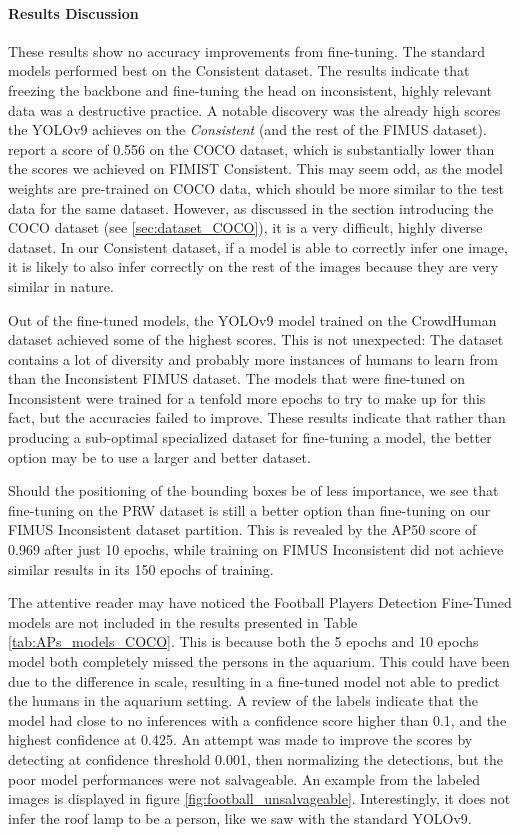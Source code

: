 \paragraph{Results Discussion}
\label{sec:table_discussion}
These results show no accuracy improvements from fine-tuning. The standard models performed best on the Consistent dataset. The results indicate that freezing the backbone and fine-tuning the head on inconsistent, highly relevant data was a destructive practice. A notable discovery was the already high scores the YOLOv9 achieves on the \textit{Consistent} (and the rest of the FIMUS dataset). \citeauthor{wang2024yolov9} report a score of 0.556 on the COCO dataset, which is substantially lower than the scores we achieved on FIMIST Consistent. This may seem odd, as the model weights are pre-trained on COCO data, which should be more similar to the test data for the same dataset. However, as discussed in the section introducing the COCO dataset (see \ref{sec:dataset_COCO}), it is a very difficult, highly diverse dataset. In our Consistent dataset, if a model is able to correctly infer one image, it is likely to also infer correctly on the rest of the images because they are very similar in nature.

Out of the fine-tuned models, the YOLOv9 model trained on the CrowdHuman dataset achieved some of the highest scores. This is not unexpected: The dataset contains a lot of diversity and probably more instances of humans to learn from than the Inconsistent FIMUS dataset. The models that were fine-tuned on Inconsistent were trained for a tenfold more epochs to try to make up for this fact, but the accuracies failed to improve. These results indicate that rather than producing a sub-optimal specialized dataset for fine-tuning a model, the better option may be to use a larger and better dataset.

Should the positioning of the bounding boxes be of less importance, we see that fine-tuning on the PRW dataset is still a better option than fine-tuning on our FIMUS Inconsistent dataset partition. This is revealed by the AP50 score of 0.969 after just 10 epochs, while training on FIMUS Inconsistent did not achieve similar results in its 150 epochs of training.

The attentive reader may have noticed the Football Players Detection Fine-Tuned models are not included in the results presented in Table \ref{tab:APs_models_COCO}. This is because both the 5 epochs and 10 epochs model both completely missed the persons in the aquarium. This could have been due to the difference in scale, resulting in a fine-tuned model not able to predict the humans in the aquarium setting. A review of the labels indicate that the model had close to no inferences with a confidence score higher than 0.1, and the highest confidence at 0.425. An attempt was made to improve the scores by detecting at confidence threshold 0.001, then normalizing the detections, but the poor model performances were not salvageable. An example from the labeled images is displayed in figure \ref{fig:football_unsalvageable}. Interestingly, it does not infer the roof lamp to be a person, like we saw with the standard YOLOv9.

